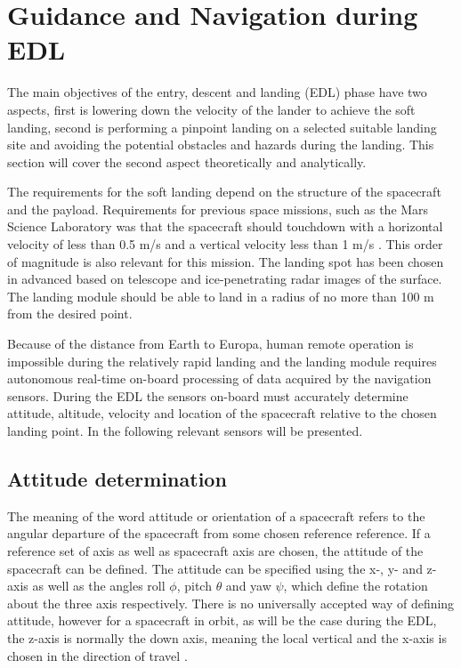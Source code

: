 \section{Guidance and Navigation during EDL}

The main objectives of the entry, descent and landing (EDL) phase have two aspects, first is lowering down the velocity of the lander to achieve the soft landing, second is performing a pinpoint landing on a selected suitable landing site and avoiding the potential obstacles and hazards during the landing. This section will cover the second aspect theoretically and analytically. 

The requirements for the soft landing depend on the structure of the spacecraft and the payload. Requirements for previous space missions, such as the Mars Science Laboratory was that the spacecraft should touchdown with a horizontal velocity of less than 0.5 m/s and a vertical velocity less than 1 m/s \cite{alhat}. This order of magnitude is also relevant for this mission. The landing spot has been chosen in advanced based on telescope and ice-penetrating radar images of the surface. The landing module should be able to land in a radius of no more than 100 m from the desired point. 

Because of the distance from Earth to Europa, human remote operation is impossible during the relatively rapid landing and the landing module requires autonomous real-time on-board processing of data acquired by the navigation sensors. During the EDL the sensors on-board must accurately determine attitude, altitude, velocity and location of the spacecraft relative to the chosen landing point. In the following relevant sensors will be presented. 

\subsection{Attitude determination}

The meaning of the word attitude or orientation of a spacecraft refers to the angular departure of the spacecraft from some chosen reference reference. If a reference set of axis as well as spacecraft axis are chosen, the attitude of the spacecraft can be defined. The attitude can be specified using the x-, y- and z- axis as well as the angles roll $\phi$, pitch $\theta$ and yaw $\psi$, which define the rotation about the three axis respectively. There is no universally accepted way of defining attitude, however for a spacecraft in orbit, as will be the case during the EDL, the z-axis is normally the down axis, meaning the local vertical and the x-axis is chosen in the direction of travel \cite{spacecraft}.

